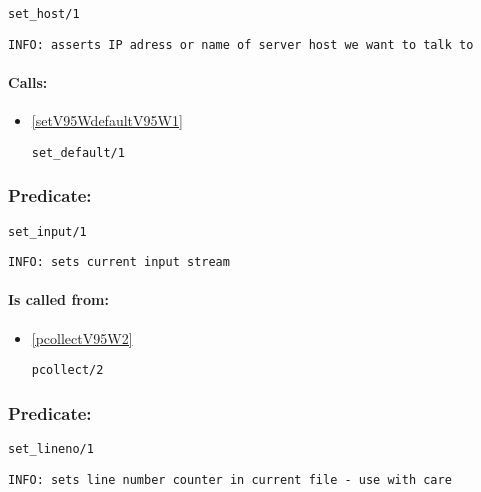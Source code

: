 \begin{verbatim}
set_host/1
\end{verbatim}

{\small \begin{verbatim}
INFO: asserts IP adress or name of server host we want to talk to

\end{verbatim}}
\paragraph{Calls:} 
\begin{itemize}
\item \ref{setV95WdefaultV95W1} 
\begin{verbatim}
set_default/1
\end{verbatim}

\end{itemize}

\subsubsection{Predicate:} \label{setV95WinputV95W1}

\begin{verbatim}
set_input/1
\end{verbatim}

{\small \begin{verbatim}
INFO: sets current input stream

\end{verbatim}}
\paragraph{Is called from:} 
\begin{itemize}
\item \ref{pcollectV95W2} 
\begin{verbatim}
pcollect/2
\end{verbatim}

\end{itemize}

\subsubsection{Predicate:} \label{setV95WlinenoV95W1}

\begin{verbatim}
set_lineno/1
\end{verbatim}

{\small \begin{verbatim}
INFO: sets line number counter in current file - use with care

\end{verbatim}}
